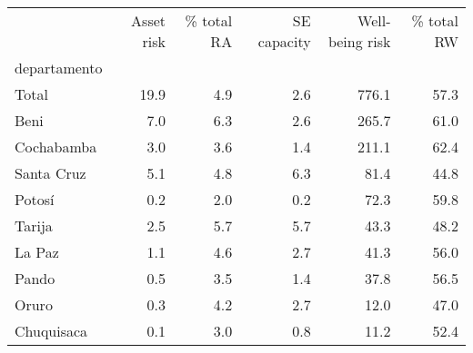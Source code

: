 \begin{tabular}{lrrrrr}
\toprule
{} &  Asset risk &  \% total RA &  SE capacity &  Well-being risk &  \% total RW \\
departamento &             &             &              &                  &             \\
\midrule
Total        &        19.9 &         4.9 &          2.6 &            776.1 &        57.3 \\
Beni         &         7.0 &         6.3 &          2.6 &            265.7 &        61.0 \\
Cochabamba   &         3.0 &         3.6 &          1.4 &            211.1 &        62.4 \\
Santa Cruz   &         5.1 &         4.8 &          6.3 &             81.4 &        44.8 \\
Potosí       &         0.2 &         2.0 &          0.2 &             72.3 &        59.8 \\
Tarija       &         2.5 &         5.7 &          5.7 &             43.3 &        48.2 \\
La Paz       &         1.1 &         4.6 &          2.7 &             41.3 &        56.0 \\
Pando        &         0.5 &         3.5 &          1.4 &             37.8 &        56.5 \\
Oruro        &         0.3 &         4.2 &          2.7 &             12.0 &        47.0 \\
Chuquisaca   &         0.1 &         3.0 &          0.8 &             11.2 &        52.4 \\
\bottomrule
\end{tabular}
